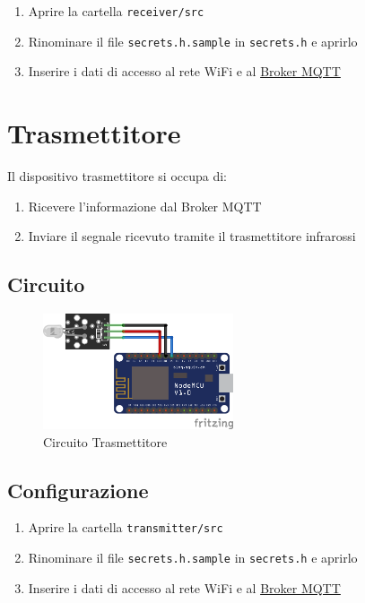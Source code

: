 \documentclass[a4paper,11pt]{article}
\begin{document}
  \begin{enumerate}
    \item Aprire la cartella \texttt{receiver/src}
    \item Rinominare il file \texttt{secrets.h.sample} in \texttt{secrets.h} e aprirlo
    \item Inserire i dati di accesso al rete WiFi e al \hyperref[sec:Broker]{Broker MQTT}
  \end{enumerate}


\section{Trasmettitore}
\label{sec:transmitter}

  Il dispositivo trasmettitore si occupa di:

  \begin{enumerate}
    \item Ricevere l'informazione dal Broker MQTT
    \item Inviare il segnale ricevuto tramite il trasmettitore infrarossi
  \end{enumerate}


  \subsection{Circuito}

    \begin{figure}[H]
      \centering
      \includegraphics[width=0.5\textwidth,height=\textheight,keepaspectratio]{assets/transmitter_fritzing}
      \caption{Circuito Trasmettitore}
    \end{figure}


  \subsection{Configurazione}

    \begin{enumerate}
      \item Aprire la cartella \texttt{transmitter/src}
      \item Rinominare il file \texttt{secrets.h.sample} in \texttt{secrets.h} e aprirlo
      \item Inserire i dati di accesso al rete WiFi e al \hyperref[sec:Broker]{Broker MQTT}
    \end{enumerate}
\end{document}
